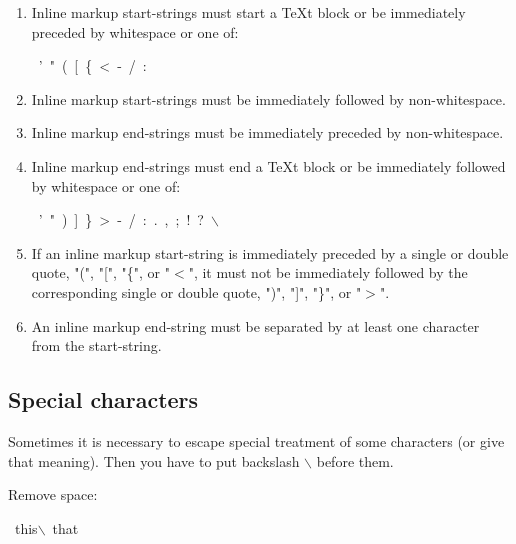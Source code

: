 \documentclass[12pt]{article}
\begin{document}
\begin{enumerate}[label=\arabic*.]
\item
Inline markup start-strings must start a \TeX{}t block or be
immediately preceded by whitespace or one of:

\begin{ttfamily}\begin{flushleft}
\mbox{~'~"~(~[~\{~<~-~/~:}\\
\end{flushleft}\end{ttfamily}

\item
Inline markup start-strings must be immediately followed by
non-whitespace.

\item
Inline markup end-strings must be immediately preceded by
non-whitespace.

\item
Inline markup end-strings must end a \TeX{}t block or be immediately
followed by whitespace or one of:

\begin{ttfamily}\begin{flushleft}
\mbox{~'~"~)~]~\}~>~-~/~:~.~,~;~!~?~$\backslash$}\\
\end{flushleft}\end{ttfamily}

\item
If an inline markup start-string is immediately preceded by a
single or double quote, "(", "[", "\{", or "$<$", it must not be
immediately followed by the corresponding single or double quote,
")", "]", "\}", or "$>$".

\item
An inline markup end-string must be separated by at least one
character from the start-string.
\end{enumerate}
\hypertarget{lspecial-characters}{}
\subsection{Special characters}

Sometimes it is necessary to escape special treatment of some
characters (or give that meaning). Then you have to put backslash \texttt{$\backslash$}
before them.

Remove space:

\begin{ttfamily}\begin{flushleft}
\mbox{~this$\backslash$~that}\\
\end{flushleft}\end{ttfamily}
\end{document}
